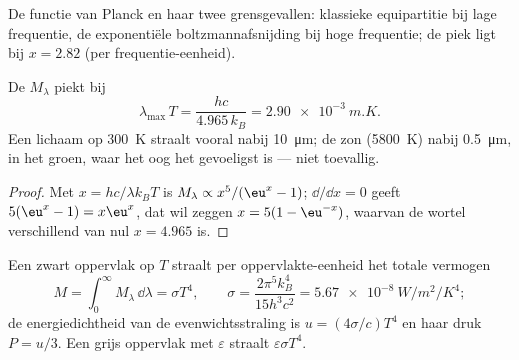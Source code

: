 \begin{omfigure}

{\small De functie van Planck en haar twee grensgevallen: klassieke equipartitie
bij lage frequentie, de exponentiële boltzmannafsnijding bij hoge frequentie;
de piek ligt bij $x = 2.82$ (per frequentie-eenheid).}
\end{omfigure}

\begin{proposition}\label{prop:b2:thermal-radiation:wien}
De  $M_\lambda$ piekt bij
\[
\lambda_{\max}\,T = \frac{hc}{4.965\,k_B} = \qty{2.90e-3}{m.K} .
\]
Een lichaam op \qty{300}{K} straalt vooral nabij \qty{10}{\micro m}; de zon
(\qty{5800}{K}) nabij \qty{0.5}{\micro m}, in het groen, waar het oog het
gevoeligst is --- niet toevallig.
\end{proposition}

\begin{proof}
Met $x = hc/\lambda k_BT$ is $M_\lambda \propto x^5/(\eu^x - 1)$; $\dd/\dd x = 0$
geeft $5(\eu^x - 1) = x\eu^x$, dat wil zeggen $x = 5(1 - \eu^{-x})$, waarvan
de wortel
verschillend van nul $x = 4.965$ is.
\end{proof}

\begin{theorem}\label{thm:b2:thermal-radiation:stefan}
Een zwart oppervlak op $T$ straalt per oppervlakte-eenheid het totale vermogen
\[
M = \int_0^\infty M_\lambda\,\dd\lambda = \sigma T^4, \qquad
\sigma = \frac{2\pi^5k_B^4}{15h^3c^2} = \qty{5.67e-8}{W/m^2/K^4} ;
\]
de energiedichtheid van de evenwichtsstraling is $u = (4\sigma/c)T^4$
en haar druk $P = u/3$. Een grijs oppervlak met  $\varepsilon$
straalt $\varepsilon\sigma T^4$.
\end{theorem}

